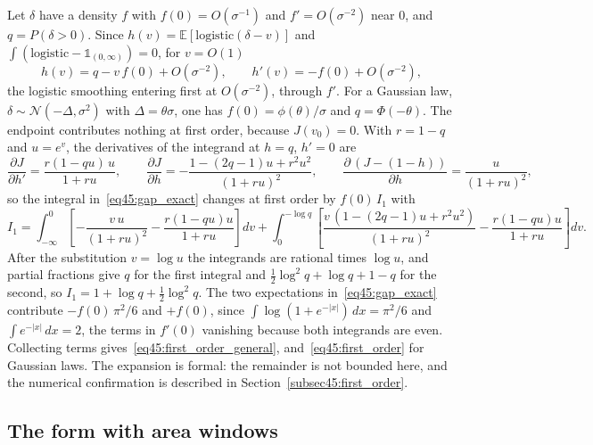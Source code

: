 \documentclass[11pt,letterpaper]{article}
\theoremstyle{plain}
\theoremstyle{definition}
\theoremstyle{remark}
\begin{document}
Let $\delta$ have a density $f$ with $f(0) = O(\sigma^{-1})$ and $f' = O(\sigma^{-2})$ near $0$, and $q = P(\delta > 0)$. Since $h(v) = \mathbb{E}[\mathrm{logistic}(\delta - v)]$ and $\int(\mathrm{logistic} - \mathbb{1}_{(0,\infty)}) = 0$, for $v = O(1)$
\begin{equation}
h(v) = q - v\,f(0) + O(\sigma^{-2}), \qquad h'(v) = -f(0) + O(\sigma^{-2}),
\end{equation}
the logistic smoothing entering first at $O(\sigma^{-2})$, through $f'$. For a Gaussian law, $\delta \sim \mathcal{N}(-\Delta, \sigma^2)$ with $\Delta = \theta\sigma$, one has $f(0) = \phi(\theta)/\sigma$ and $q = \Phi(-\theta)$. The endpoint contributes nothing at first order, because $J(v_0) = 0$. With $r = 1 - q$ and $u = e^{v}$, the derivatives of the integrand at $h = q$, $h' = 0$ are
\begin{equation}
\frac{\partial J}{\partial h'} = \frac{r(1 - qu)\,u}{1 + ru}, \qquad
\frac{\partial J}{\partial h} = -\frac{1 - (2q-1)u + r^2u^2}{(1 + ru)^2}, \qquad
\frac{\partial\,(J - (1-h))}{\partial h} = \frac{u}{(1 + ru)^2},
\end{equation}
so the integral in~\eqref{eq45:gap_exact} changes at first order by $f(0)\, I_1$ with
\begin{equation}
I_1 = \int_{-\infty}^{0}\left[-\frac{v\,u}{(1+ru)^2} - \frac{r(1-qu)u}{1+ru}\right] dv
+ \int_{0}^{-\log q}\left[\frac{v\,(1 - (2q-1)u + r^2u^2)}{(1+ru)^2} - \frac{r(1-qu)u}{1+ru}\right] dv .
\end{equation}
After the substitution $v = \log u$ the integrands are rational times $\log u$, and partial fractions give $q$ for the first integral and $\tfrac12\log^2 q + \log q + 1 - q$ for the second, so $I_1 = 1 + \log q + \tfrac12\log^2 q$. The two expectations in~\eqref{eq45:gap_exact} contribute $-f(0)\,\pi^2/6$ and $+f(0)$, since $\int\log(1+e^{-|x|})\,dx = \pi^2/6$ and $\int e^{-|x|}\,dx = 2$, the terms in $f'(0)$ vanishing because both integrands are even. Collecting terms gives~\eqref{eq45:first_order_general}, and~\eqref{eq45:first_order} for Gaussian laws. The expansion is formal: the remainder is not bounded here, and the numerical confirmation is described in Section~\ref{subsec45:first_order}.

\subsection{The form with area windows}
\label{subsecD:windows}
\end{document}
